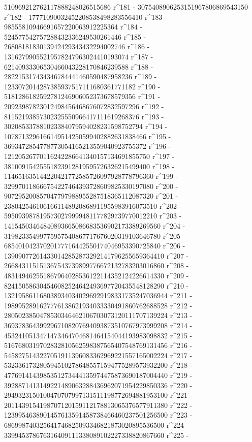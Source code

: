        510969212762117888248026515686 r^181 - 
       3075408906253151967806869543150 r^182 - 
       17771090032452208538498283556410 r^183 - 
       98555810946691657220063912225364 r^184 - 
       524577542757288432336249530261446 r^185 - 
       2680818183013942429343432294002746 r^186 - 
       13162799055219578247963024410193074 r^187 - 
       62140933306530466043228170846239588 r^188 - 
       282215317434346784441460590487958236 r^189 - 
       1233072014287385937517111680361771182 r^190 - 
       5181286182592781246906052373678579356 r^191 - 
       20923987823012498456468676072832597296 r^192 - 
       81152193857302325550966417111619268376 r^193 - 
       302085337881023384079594028231598752794 r^194 - 
       1078713296166149514250599402882631838466 r^195 - 
       3693472854778773054165213559040923755372 r^196 - 
       12120526770116242286641340157134691855750 r^197 - 
       38100915425551823912819595726326215499400 r^198 - 
       114651635144220421772585726097928778796360 r^199 - 
       329970118666754227464393728609825330197080 r^200 - 
       907295200857047797988955287518365112087320 r^201 - 
       2380425461061661148920868911955983916073510 r^202 - 
       5950939878195730279999481177829739770012210 r^203 - 
       14154503464840893665086683536902173389269560 r^204 - 
       31982335499775957540867717676020319103646780 r^205 - 
       68540104237020177716442550174046953390725840 r^206 - 
       139090772614330142852873292141796255659364410 r^207 - 
       266843115151367543739899776672132783203016860 r^208 - 
       483149462551867964028536122114352124226614330 r^209 - 
       824150586304546082524642493697720435548128290 r^210 - 
       1321958611680389340340296929198331735247036944 r^211 - 
       1989952891627776138621934033330491860762688528 r^212 - 
       2805023850478530346462106703073120111707139224 r^213 - 
       3693783643992967108207694093873510767973999208 r^214 - 
       4532410513471473464704681464154044193983098832 r^215 - 
       5167680319702832810562598387565407548769131456 r^216 - 
       5458275143227051911396083362969221557165002224 r^217 - 
       5323361732805945102786485571594775289573932200 r^218 - 
       4776914143985351273444135974475873690187004440 r^219 - 
       3928871413149221489063288436962071954229850336 r^220 - 
       2949323150100470707997131511198772694881953100 r^221 - 
       2011439154198707120159112178813065376577911380 r^222 - 
       1239954638901457613591458738466460237501256500 r^223 - 
       686998740325641746825093346821873020895536500 r^224 - 
       339945378676316409111338089102227338820867660 r^225 - 
